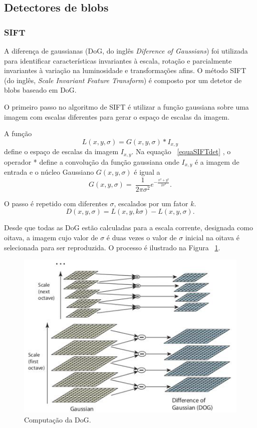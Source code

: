 \subsection{Detectores de blobs}

\subsubsection{SIFT}

A diferença de gaussianas (DoG, do inglês \textit{Diference of Gaussians}) foi utilizada para identificar características invariantes à escala, rotação e parcialmente invariantes à variação na luminosidade e transformações afins. O método SIFT (do inglês, \textit{Scale Invariant Feature Transform}) é composto por um detetor de blobs baseado em DoG.

O primeiro passo no algoritmo de SIFT é utilizar a função gaussiana sobre uma imagem com escalas diferentes para gerar o espaço de escalas da imagem.

A função \begin{equation}\label{equaSIFTdet}
\textit{L}(x,y,\sigma) = \textit{G}(x,y,\sigma)*\textit{I}_{x,y} \end{equation}
define o espaço de escalas da imagem $\textit{I}_{x,y}$. Na equação ~\ref{equaSIFTdet}
, o operador * define a convolução da função gaussiana onde $\textit{I}_{x,y}$ é a imagem de entrada e o núcleo Gaussiano $\textit{G}(x,y,\sigma)$ é igual a  \[ G( \textit{x},\textit{y},\textit{$\sigma$}) =\ \frac{1}{2\pi\sigma^2} e^{-\frac{x^2 + y^2}{2\sigma^2}} . \]

O passo é repetido com diferentes $\sigma$, escalados por um fator $\textit{k}$. \[ \textit{D}(x,y,\sigma) = \textit{L}(x,y,\textit{k}\sigma) - \textit{L}(x,y,\sigma). \]

Desde que todas as DoG estão calculadas para a escala corrente, designada como oitava, a imagem cujo valor de $\sigma$ é duas vezes o valor de $\sigma$ inicial na oitava é selecionada para ser reproduzida. O processo é ilustrado na Figura ~\ref{fig:compitation-of-dog}.

\begin{figure}[h!]
	\centering
	\includegraphics[width=0.7\linewidth]{figures/compitationofDoG}
	\caption{Computação da DoG. \cite{VisualOdometryRodasVehicles}}
	\label{fig:compitation-of-dog}
\end{figure}

